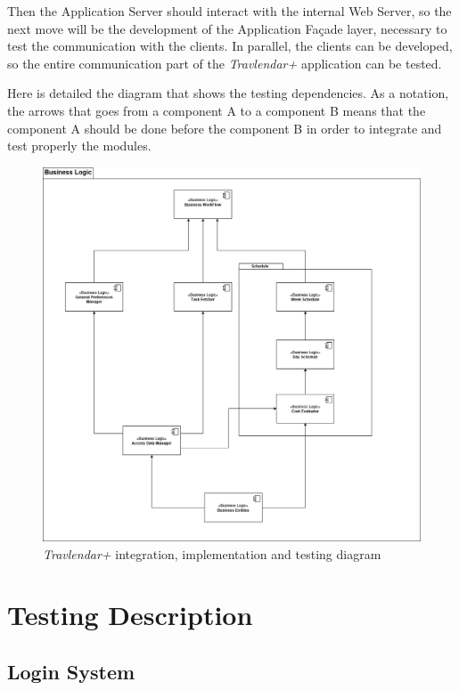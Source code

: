 Then the Application Server should interact with the internal Web Server, so the next move will be the development of the Application Façade layer, necessary to test the communication with the clients.
In parallel, the clients can be developed, so the entire communication part of the \emph{Travlendar+} application can be tested.

Here is detailed the diagram that shows the testing dependencies. As a notation, the arrows that goes from a component A to a component B means that the component A should be done before the component B in order to integrate and test properly the modules.

\begin{figure}[H]
    \centering
    \includegraphics[scale=0.35]{Pictures/ImplementationDiagram/IntegrationDiagram.png}
    \caption{\emph{Travlendar+} integration, implementation and testing diagram}
\end{figure}

\section{Testing Description}

\renewcommand{\arraystretch}{1.9}

\subsection*{Login System}

